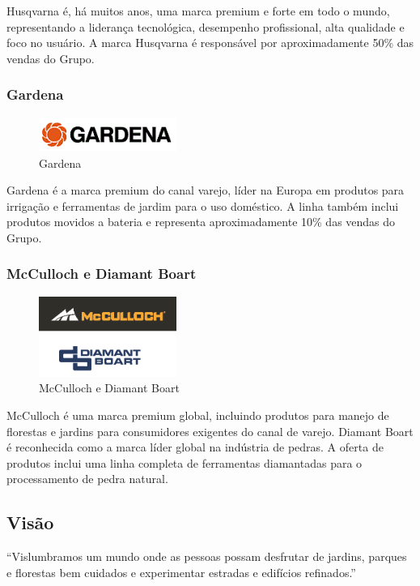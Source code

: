 \documentclass[12pt]{article}
\begin{document}
	Husqvarna é, há muitos anos, uma marca premium e forte em todo o mundo, representando a liderança tecnológica, desempenho profissional, alta qualidade e foco no usuário. A marca Husqvarna é responsável por aproximadamente 50\% das vendas do Grupo.

\subsubsection{Gardena}

\begin{figure}[h!]
	\centering
	\includegraphics[width=0.4\textwidth]{img/logo-gardena.png}
	\caption{Gardena}
\end{figure}

	Gardena é a marca premium do canal varejo, líder na Europa em produtos para irrigação e ferramentas de jardim para o uso doméstico. A linha também inclui produtos movidos a bateria e representa aproximadamente 10\% das vendas do Grupo.

\subsubsection{McCulloch e Diamant Boart}

\begin{figure}[h!]
	\centering
	\includegraphics[width=0.4\textwidth]{img/logo-mcdb.png}
	\caption{McCulloch e Diamant Boart}
\end{figure}

	McCulloch é uma marca premium global, incluindo produtos para manejo de florestas e jardins para consumidores exigentes do canal de varejo. 
	Diamant Boart é reconhecida como a marca líder global na indústria de pedras. A oferta de produtos inclui uma linha completa de ferramentas diamantadas para o processamento de pedra natural.	

\subsection{Visão}
	``Vislumbramos um mundo onde as pessoas possam desfrutar de jardins, parques e florestas bem cuidados e experimentar estradas e edifícios refinados.''
\end{document}
